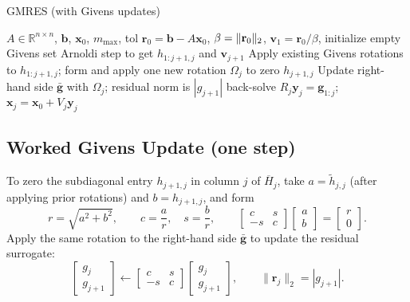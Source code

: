 \begin{algorithm}[H]
  \caption{GMRES (with Givens updates)}\label{alg:gmres}
  \begin{algorithmic}[0]
    \Require $A\in\mathbb{R}^{n\times n}$, $\mathbf{b}$, $\mathbf{x}_0$, $m_{\max}$, tol
    \State $\mathbf{r}_0=\mathbf{b}-A\mathbf{x}_0$, $\beta=\lVert\mathbf{r}_0\rVert_2$, $\mathbf{v}_1=\mathbf{r}_0/\beta$, initialize empty Givens set
    \State Arnoldi step to get $h_{1:j+1,j}$ and $\mathbf{v}_{j+1}$
    \State Apply existing Givens rotations to $h_{1:j+1,j}$; form and apply one new rotation $\Omega_j$ to zero $h_{j+1,j}$
    \State Update right-hand side $\bar{\mathbf{g}}$ with $\Omega_j$; residual norm is $|g_{j+1}|$
     \State back-solve $R_j\mathbf{y}_j=\mathbf{g}_{1:j}$; \Return $\mathbf{x}_j=\mathbf{x}_0+V_j\mathbf{y}_j$ \EndIf
    \EndFor
  \end{algorithmic}
\end{algorithm}

\subsection*{Worked Givens Update (one step)}
To zero the subdiagonal entry $h_{j+1,j}$ in column $j$ of $\overline H_j$, take $a=\tilde h_{j,j}$ (after applying prior rotations) and $b=h_{j+1,j}$, and form
\[
  r=\sqrt{a^2+b^2},\qquad c=\frac{a}{r},\quad s=\frac{b}{r},\qquad \begin{bmatrix}c&s\\-s&c\end{bmatrix}\begin{bmatrix}a\\ b\end{bmatrix}=\begin{bmatrix}r\\ 0\end{bmatrix}.
\]
Apply the same rotation to the right-hand side $\bar{\mathbf g}$ to update the residual surrogate:
\[
  \begin{bmatrix}g_j\\ g_{j+1}\end{bmatrix} \leftarrow \begin{bmatrix}c&s\\-s&c\end{bmatrix} \begin{bmatrix}g_j\\ g_{j+1}\end{bmatrix},\qquad \|\mathbf r_j\|_2=|g_{j+1}|.
\]

